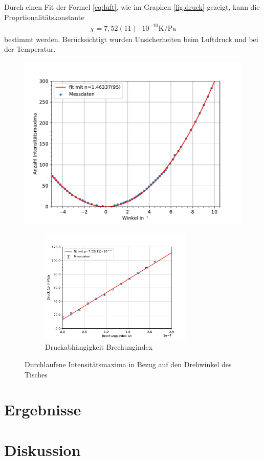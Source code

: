 \documentclass[11pt, a4paper]{article}
\begin{document}
    Durch einen Fit der Formel \ref{eq:luft}, wie im Graphen \ref{fig:druck} gezeigt, kann die Proprtionalitätskonstante
    \begin{align}
        \chi = 7,52(11) \cdot 10^{-10} \si{\kelvin\per\pascal}
    \end{align}
    bestimmt werden. Berücksichtigt wurden Unsicherheiten beim Luftdruck und bei der Temperatur.
    \begin{figure}[!h]
        \centering
        \includegraphics[width=\textwidth]{./plots/plexi.pdf}

    \begin{figure}
        \centering
        \includegraphics[width=0.8\textwidth]{./plots/druck.pdf}
        \caption{Druckabhängigkeit Brechungindex}
        \label{fig:luft}
    \end{figure}
        \caption{Durchlaufene Intensitätsmaxima in Bezug auf den Drehwinkel des Tisches}
        \label{fig:plexiplot}
    \end{figure}

    \section{Ergebnisse}

    \section{Diskussion}

    
    
\end{document}
